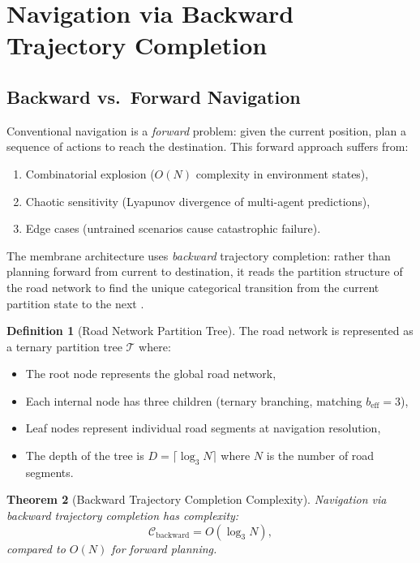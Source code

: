 \documentclass[twocolumn,10pt]{article}
\newtheorem{theorem}{Theorem}[section]
\theoremstyle{definition}
\newtheorem{definition}[theorem]{Definition}
\theoremstyle{remark}
\newcommand{\beff}{b_{\mathrm{eff}}}
\begin{document}
\section{Navigation via Backward Trajectory Completion}
\label{sec:navigation}

\subsection{Backward vs.\ Forward Navigation}

Conventional navigation is a \emph{forward} problem: given the current position, plan a sequence of actions to reach the destination. This forward approach suffers from:
\begin{enumerate}[label=(\roman*)]
  \item Combinatorial explosion ($O(N)$ complexity in environment states),
  \item Chaotic sensitivity (Lyapunov divergence of multi-agent predictions),
  \item Edge cases (untrained scenarios cause catastrophic failure).
\end{enumerate}

The membrane architecture uses \emph{backward} trajectory completion: rather than planning forward from current to destination, it reads the partition structure of the road network to find the unique categorical transition from the current partition state to the next \cite{sachikonye2026backward, sachikonye2026trajectory}.

\begin{definition}[Road Network Partition Tree]
\label{def:road_tree}
The road network is represented as a ternary partition tree $\mathcal{T}$ where:
\begin{itemize}
  \item The root node represents the global road network,
  \item Each internal node has three children (ternary branching, matching $\beff = 3$),
  \item Leaf nodes represent individual road segments at navigation resolution,
  \item The depth of the tree is $D = \lceil \log_3 N \rceil$ where $N$ is the number of road segments.
\end{itemize}
\end{definition}

\begin{theorem}[Backward Trajectory Completion Complexity]
\label{thm:backward}
Navigation via backward trajectory completion has complexity:
\begin{equation}
  \mathcal{C}_{\mathrm{backward}} = O(\log_3 N),
  \label{eq:backward_complexity}
\end{equation}
compared to $O(N)$ for forward planning.
\end{theorem}
\end{document}
